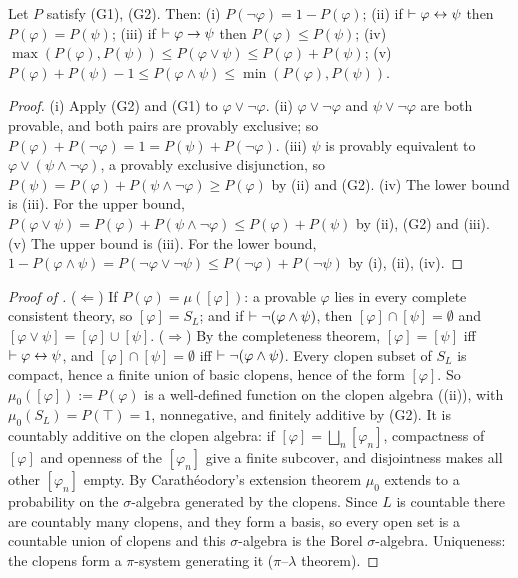 \begin{lemma}\label{lem:existence:gaifmanbasic}
Let $P$ satisfy (G1), (G2). Then: \textup{(i)} $P(\neg\varphi)=1-P(\varphi)$; \textup{(ii)} if $\vdash\varphi\leftrightarrow\psi$ then $P(\varphi)=P(\psi)$; \textup{(iii)} if $\vdash\varphi\to\psi$ then $P(\varphi)\le P(\psi)$; \textup{(iv)} $\max(P(\varphi),P(\psi))\le P(\varphi\vee\psi)\le P(\varphi)+P(\psi)$; \textup{(v)} $P(\varphi)+P(\psi)-1\le P(\varphi\wedge\psi)\le\min(P(\varphi),P(\psi))$.
\end{lemma}

\begin{proof}
(i) Apply (G2) and (G1) to $\varphi\vee\neg\varphi$. (ii) $\varphi\vee\neg\varphi$ and $\psi\vee\neg\varphi$ are both provable, and both pairs are provably exclusive; so $P(\varphi)+P(\neg\varphi)=1=P(\psi)+P(\neg\varphi)$. (iii) $\psi$ is provably equivalent to $\varphi\vee(\psi\wedge\neg\varphi)$, a provably exclusive disjunction, so $P(\psi)=P(\varphi)+P(\psi\wedge\neg\varphi)\ge P(\varphi)$ by (ii) and (G2). (iv) The lower bound is (iii). For the upper bound, $P(\varphi\vee\psi)=P(\varphi)+P(\psi\wedge\neg\varphi)\le P(\varphi)+P(\psi)$ by (ii), (G2) and (iii). (v) The upper bound is (iii). For the lower bound, $1-P(\varphi\wedge\psi)=P(\neg\varphi\vee\neg\psi)\le P(\neg\varphi)+P(\neg\psi)$ by (i), (ii), (iv).
\end{proof}

\begin{proof}[Proof of ]
($\Leftarrow$) If $P(\varphi)=\mu([\varphi])$: a provable $\varphi$ lies in every complete consistent theory, so $[\varphi]=S_L$; and if $\vdash\neg(\varphi\wedge\psi)$, then $[\varphi]\cap[\psi]=\emptyset$ and $[\varphi\vee\psi]=[\varphi]\cup[\psi]$.
($\Rightarrow$) By the completeness theorem, $[\varphi]=[\psi]$ iff $\vdash\varphi\leftrightarrow\psi$, and $[\varphi]\cap[\psi]=\emptyset$ iff $\vdash\neg(\varphi\wedge\psi)$. Every clopen subset of $S_L$ is compact, hence a finite union of basic clopens, hence of the form $[\varphi]$. So $\mu_0([\varphi]):=P(\varphi)$ is a well-defined function on the clopen algebra ((ii)), with $\mu_0(S_L)=P(\top)=1$, nonnegative, and finitely additive by (G2). It is countably additive on the clopen algebra: if $[\varphi]=\bigsqcup_n[\varphi_n]$, compactness of $[\varphi]$ and openness of the $[\varphi_n]$ give a finite subcover, and disjointness makes all other $[\varphi_n]$ empty. By Carath\'eodory's extension theorem $\mu_0$ extends to a probability on the $\sigma$-algebra generated by the clopens. Since $L$ is countable there are countably many clopens, and they form a basis, so every open set is a countable union of clopens and this $\sigma$-algebra is the Borel $\sigma$-algebra. Uniqueness: the clopens form a $\pi$-system generating it ($\pi$--$\lambda$ theorem).
\end{proof}

